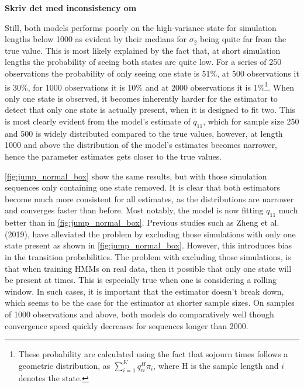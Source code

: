 \textbf{Skriv det med inconsistency om}

Still, both models performs poorly on the high-variance state for simulation lengths below 1000 as evident by their medians for $\sigma_2$ being quite far from the true value. This is most likely explained by the fact that, at short simulation lengths the probability of seeing both states are quite low. For a series of 250 observations the probability of only seeing one state is 51\%, at 500 observations it is 30\%, for 1000 observations it is 10\% and at 2000 observations it is 1\%\footnote
{These probability are calculated using the fact that sojourn times follows a geometric distribution, as $\sum_{i=1}^K q_{ii}^H\pi_i$, where H is the sample length and $i$ denotes the state.
}. 
When only one state is observed, it becomes inherently harder for the estimator to detect that only one state is actually present, when it is designed to fit two. This is most clearly evident from the \mle model's estimate of $q_{11}$, which for sample size 250 and 500 is widely distributed compared to the true values, however, at length 1000 and above the distribution of the model's estimates becomes narrower, hence the parameter estimates gets closer to the true values.

\cref{fig:jump_normal_box} show the same results, but with those simulation sequences only containing one state removed. It is clear that both estimators become much more consistent for all estimates, as the distributions are narrower and converges faster than before. Most notably, the \mle model is now fitting $q_{11}$ much better than in \cref{fig:jump_normal_box}. Previous studies such as Zheng et al. (2019), have alleviated the problem by excluding those simulations with only one state present as shown in \cref{fig:jump_normal_box}. However, this introduces bias in the transition probabilities. The problem with excluding those simulations, is that when training HMMs on real data, then it possible that only one state will be present at times. This is especially true when one is considering a rolling window. In such cases, it is important that the estimator doesn't break down, which seems to be the case for the \mle estimator at shorter sample sizes. On samples of 1000 observations and above, both models do comparatively well though convergence speed quickly decreases for sequences longer than 2000.

